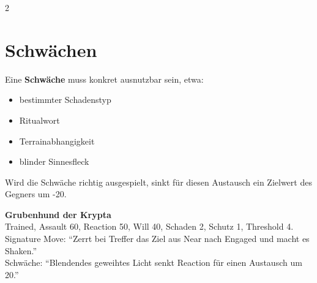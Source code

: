\begin{multicols*}{2}
\section{Schwächen}
Eine \textbf{Schwäche} muss konkret ausnutzbar sein, etwa:
\begin{itemize}[leftmargin=*]
\item bestimmter Schadenstyp
\item Ritualwort
\item Terrainabhangigkeit
\item blinder Sinnesfleck
\end{itemize}

Wird die Schwäche richtig ausgespielt, sinkt für diesen Austausch ein Zielwert des Gegners um -20.

\begin{ruleexample}
\textbf{Grubenhund der Krypta}\\
Trained, Assault 60, Reaction 50, Will 40, Schaden 2, Schutz 1, Threshold 4.\\
Signature Move: ``Zerrt bei Treffer das Ziel aus Near nach Engaged und macht es Shaken.''\\
Schwäche: ``Blendendes geweihtes Licht senkt Reaction für einen Austausch um 20.'' 
\end{ruleexample}
\end{multicols*}
